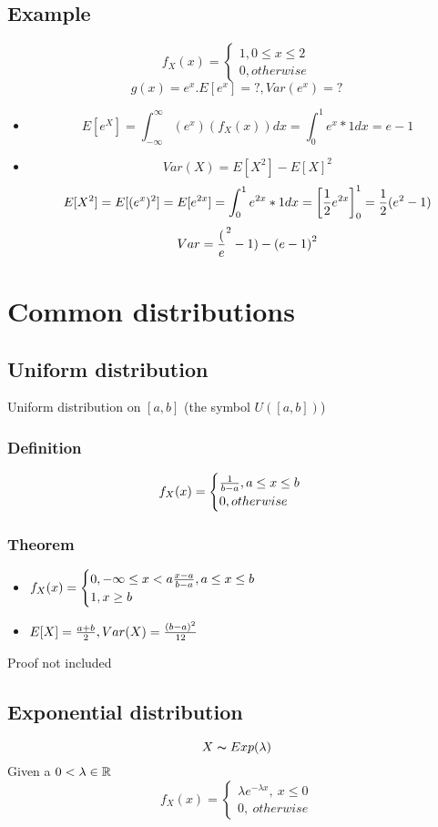 \documentclass{article}
\newcommand{\intf}{\int^{\infty}_{-\infty}}
\newcommand{\intb}{\int^{1}_{0}}
\begin{document}
\subsection{Example}
$$ f_X(x) =
  \begin{cases}
    1, 0\le x\le 2\\
    0, otherwise
  \end{cases}
$$
$$ g(x) = e^x. E[e^x] = ?, Var(e^x) = ? $$
\begin{itemize}
  \item $$ E[e^X] = \intf (e^x)(f_X(x))dx = \int^1_0 e^x * 1 dx = e - 1 $$
  \item $$ Var(X) = E[X^2] - E[X]^2 $$
    $$ E[X^2] = E[(e^x)^2] = E[e^{2x}] = \intb e^{2x} * 1 dx  = {\left[ \f 12 e^{2x}\right]}^1_0 = \f 12(e^2-1)$$
    $$ Var = \frac{(}{e}^2-1) - {(e-1)}^2 $$
\end{itemize}

\section{Common distributions}
\subsection{Uniform distribution}
Uniform distribution on $[a,b]$ (the symbol $U([a,b])$)
\subsubsection{Definition}
$$ f_X(x) =
  \begin{cases}
    \frac{1}{b-a}, a\le x\le b\\
    0, otherwise
  \end{cases}
$$

\subsubsection{Theorem}
\begin{itemize}
  \item  $ f_X(x) =
  \begin{cases}
    0, -\infty \le x < a
    \frac{x-a}{b-a}, a\le x\le b\\
    1, x\ge b
  \end{cases}$
 \item $ E[X] = \frac{a+b}{2}, Var(X) = \frac{{(b-a)}^2}{12} $
\end{itemize}

{\color{red} Proof not included}

\subsection{Exponential distribution}
$$ X\thicksim Exp(\lambda) $$
Given a $0 < \lambda \in {\mathbb R}$
$$ f_X(x) = \begin{cases}
  \lambda e^{-\lambda x},\ x\le 0\\
  0,\ otherwise
\end{cases} $$
\end{document}
